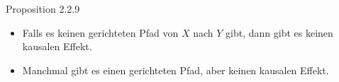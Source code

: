 \begin{frame}{Proposition 2.2.9}
    \begin{itemize}
        \item<1-> Falls es keinen gerichteten Pfad von $X$ nach $Y$ gibt, dann
                  gibt es keinen kausalen Effekt.
        \item<2-> Manchmal gibt es einen gerichteten Pfad, aber keinen kausalen
                  Effekt.
    \end{itemize}
\end{frame}

